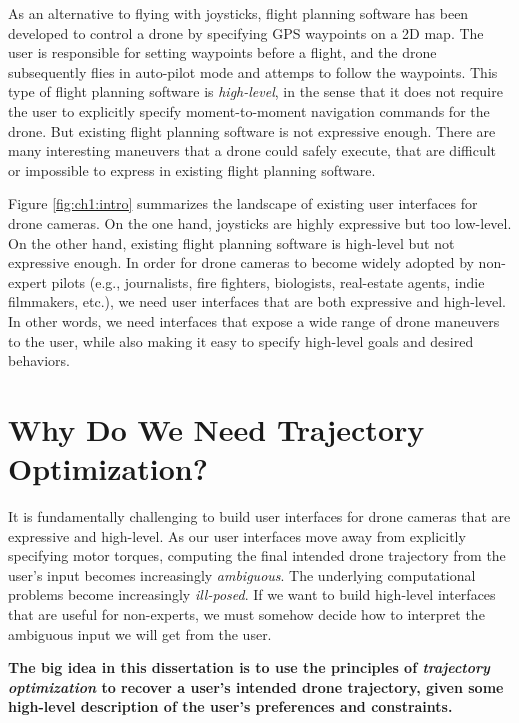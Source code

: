 As an alternative to flying with joysticks, flight planning software has been developed to control a drone by specifying GPS waypoints on a 2D map. 
The user is responsible for setting waypoints before a flight, and the drone subsequently flies in auto-pilot mode and attemps to follow the waypoints.
This type of flight planning software is \emph{high-level}, in the sense that it does not require the user to explicitly specify moment-to-moment navigation commands for the drone.
But existing flight planning software is not expressive enough.
There are many interesting maneuvers that a drone could safely execute, that are difficult or impossible to express in existing flight planning software.

Figure \ref{fig:ch1:intro} summarizes the landscape of existing user interfaces for drone cameras.
On the one hand, joysticks are highly expressive but too low-level.
On the other hand, existing flight planning software is high-level but not expressive enough.
In order for drone cameras to become widely adopted by non-expert pilots (e.g., journalists, fire fighters, biologists, real-estate agents, indie filmmakers, etc.), we need user interfaces that are both expressive and high-level.
In other words, we need interfaces that expose a wide range of drone maneuvers to the user, while also making it easy to specify high-level goals and desired behaviors.

\section{Why Do We Need Trajectory Optimization?}

It is fundamentally challenging to build user interfaces for drone cameras that are expressive and high-level.
As our user interfaces move away from explicitly specifying motor torques, computing the final intended drone trajectory from the user's input becomes increasingly \emph{ambiguous}.
The underlying computational problems become increasingly \emph{ill-posed}.
If we want to build high-level interfaces that are useful for non-experts, we must somehow decide how to interpret the ambiguous input we will get from the user.

\begin{tcolorbox}[before skip=20pt, after skip=20pt, sharp corners]
\begin{center}
\textbf{The big idea in this dissertation is to use the principles of \emph{trajectory optimization} to recover a user's intended drone trajectory, given some high-level description of the user's preferences and constraints.}
\end{center}
\end{tcolorbox}

